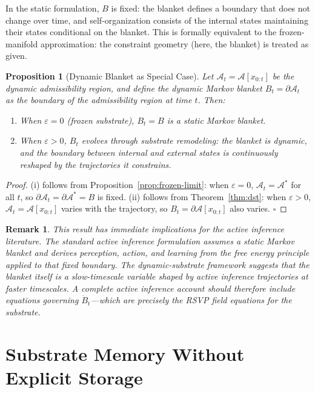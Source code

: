 \documentclass[12pt,a4paper]{article}
\newtheorem{proposition}[theorem]{Proposition}
\newtheorem{remark}[theorem]{Remark}
\begin{document}
In the static formulation, $B$ is fixed: the blanket defines a boundary that does not change over time, and self-organization consists of the internal states maintaining their states conditional on the blanket. This is formally equivalent to the frozen-manifold approximation: the constraint geometry (here, the blanket) is treated as given.

\begin{proposition}[Dynamic Blanket as Special Case]
\label{prop:markov}
Let $\mathcal{A}_t = \mathcal{A}[x_{0:t}]$ be the dynamic admissibility region, and define the \emph{dynamic Markov blanket} $B_t = \partial \mathcal{A}_t$ as the boundary of the admissibility region at time $t$. Then:
\begin{enumerate}[label=(\roman*)]
  \item When $\varepsilon = 0$ (frozen substrate), $B_t = B$ is a static Markov blanket.
  \item When $\varepsilon > 0$, $B_t$ evolves through substrate remodeling: the blanket is dynamic, and the boundary between internal and external states is continuously reshaped by the trajectories it constrains.
\end{enumerate}
\end{proposition}

\begin{proof}
(i) follows from Proposition~\ref{prop:frozen-limit}: when $\varepsilon = 0$, $\mathcal{A}_t = \mathcal{A}^*$ for all $t$, so $\partial\mathcal{A}_t = \partial\mathcal{A}^* = B$ is fixed.
(ii) follows from Theorem~\ref{thm:dst}: when $\varepsilon > 0$, $\mathcal{A}_t = \mathcal{A}[x_{0:t}]$ varies with the trajectory, so $B_t = \partial\mathcal{A}[x_{0:t}]$ also varies. $\square$
\end{proof}

\begin{remark}
This result has immediate implications for the active inference literature. The standard active inference formulation assumes a static Markov blanket and derives perception, action, and learning from the free energy principle applied to that fixed boundary. The dynamic-substrate framework suggests that the blanket itself is a slow-timescale variable shaped by active inference trajectories at faster timescales. A complete active inference account should therefore include equations governing $\dot{B}_t$---which are precisely the RSVP field equations for the substrate.
\end{remark}

\section{Substrate Memory Without Explicit Storage}
\label{app:memory}
\end{document}
